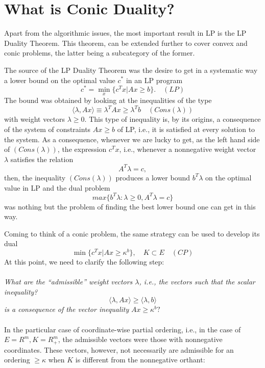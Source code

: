 \documentclass[12pt]{article}
\begin{document}
    \section{What is Conic Duality?}
    Apart from the algorithmic issues, the most important result in LP is the LP Duality Theorem. This theorem, can be extended further to cover convex and conic problems, the latter being a subcategory of the former. \par
    The source of the LP Duality Theorem was the desire to get in a systematic way a lower bound on the
    optimal value $c^*$ in an LP program
    $$c^* = \min\limits_{x} \{ c^T x | Ax \geq b \}. \quad (LP)$$
    The bound was obtained by looking at the inequalities of the type 
    $$\langle \lambda, Ax\rangle \equiv \lambda^T Ax \geq \lambda^T b \quad (Cons(\lambda))$$
    with weight vectors $\lambda \geq 0$. This type of inequality is, by its origins, a consequence of the system of constraints $Ax \geq b$ of LP, i.e., it is satisfied at every solution to the system. As a consequence, whenever we are lucky to get, as the left hand side of $(Cons(\lambda))$, the expression $c^T x$, i.e., whenever a nonnegative weight vector $\lambda$ satisfies the relation 
    $$A^T \lambda = c,$$
    then, the inequality $(Cons(\lambda))$ produces a lower bound $b^T \lambda$ on the optimal value in LP 
    and the dual problem 
    $$max \{b^T \lambda : \lambda \geq 0, A^T \lambda = c\}$$
    was nothing but the problem of finding the best lower bound one can get in this way.\par
    Coming to think of a conic problem, the same strategy can be used to develop its dual
    $$\min \{ c^T x | Ax \geq \kappa^b \}, \quad K \subset E \quad (CP)$$
    At this point, we need to clarify the following step: \\ \\
    \textit{What are the “admissible” weight vectors $\lambda$, i.e., the vectors such that the scalar 
    inequality?}
    $$\langle \lambda, Ax\rangle \geq \langle \lambda, b\rangle$$
    \textit{is a consequence of the vector inequality} $Ax \geq \kappa^b ?$ \\ \\
    In the particular case of coordinate-wise partial ordering, i.e., in the case of $E = R^m , K = R_+^m $, 
    the admissible vectors were those with nonnegative coordinates. These vectors, however, not necessarily 
    are admissible for an ordering $\geq \kappa$ when $K$ is different from the nonnegative orthant:
    
\end{document}
